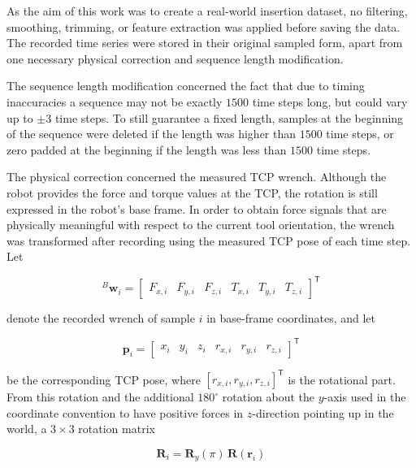 As the aim of this work was to create a real-world insertion dataset, no filtering, smoothing, trimming, or feature extraction was applied before saving the data. The recorded time series were stored in their original sampled form, apart from one necessary physical correction and sequence length modification.

The sequence length modification concerned the fact that due to timing inaccuracies a sequence may not be exactly $1500$ time steps long, but could vary up to $\pm 3$ time steps. To still guarantee a fixed length, samples at the beginning of the sequence were deleted if the length was higher than $1500$ time steps, or zero padded at the beginning if the length was less than $1500$ time steps.

The physical correction concerned the measured TCP wrench. Although the robot provides the force and torque values at the TCP, the rotation is still expressed in the robot's base frame\cite{ur-force-torque}. In order to obtain force signals that are physically meaningful with respect to the current tool orientation, the wrench was transformed after recording using the measured TCP pose of each time step. Let

\begin{equation}
    {}^{B}\mathbf{w}_i =
    \begin{bmatrix}
    F_{x,i} & F_{y,i} & F_{z,i} & T_{x,i} & T_{y,i} & T_{z,i}
    \end{bmatrix}^{\mathsf T}
    \label{eq:wrench_1}
\end{equation}

denote the recorded wrench of sample \(i\) in base-frame coordinates, and let

\begin{equation}
    \mathbf{p}_i =
    \begin{bmatrix}
    x_i & y_i & z_i & r_{x,i} & r_{y,i} & r_{z,i}
    \end{bmatrix}^{\mathsf T}
    \label{eq:wrench_2}
\end{equation}

be the corresponding TCP pose, where $[r_{x,i},r_{y,i},r_{z,i}]^{\mathsf T}$ is the rotational part. From this rotation and the additional $180^\circ$ rotation about the $y$-axis used in the coordinate convention to have positive forces in $z$-direction pointing up in the world, a $3\times3$ rotation matrix

\begin{equation}
    \mathbf{R}_i = \mathbf{R}_y(\pi)\,\mathbf{R}(\mathbf{r}_i)
    \label{eq:wrench_3}
\end{equation}


